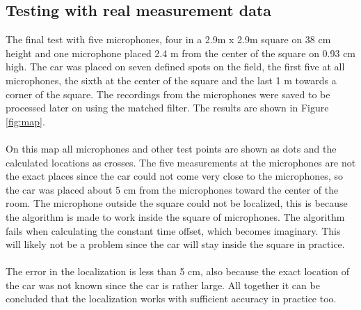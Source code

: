 \documentclass[final]{scrreprt} %
\begin{document}
\subsection{Testing with real measurement data}
The final test with five microphones, four in a 2.9m x 2.9m square on 38 cm height and one microphone placed 2.4 m from the center of the square on 0.93 cm high.
The car was placed on seven defined spots on the field, the first five at all microphones, the sixth at the center of the square and the last 1 m towards a corner of the square.
The recordings from the microphones were saved to be processed later on using the matched filter.
The results are shown in Figure \ref{fig:map}.
\\ \\
On this map all microphones and other test points are shown as dots and the calculated locations as crosses.
The five measurements at the microphones are not the exact places since the car could not come very close to the microphones, so the car was placed about 5 cm from the microphones toward the center of the room.
The microphone outside the square could not be localized, this is because the algorithm is made to work inside the square of microphones.
The algorithm fails when calculating the constant time offset, which becomes imaginary.
This will likely not be a problem since the car will stay inside the square in practice.
\\ \\
The error in the localization is less than 5 cm, also because the exact location of the car was not known since the car is rather large.
All together it can be concluded that the localization works with sufficient accuracy in practice too.
\end{document}

